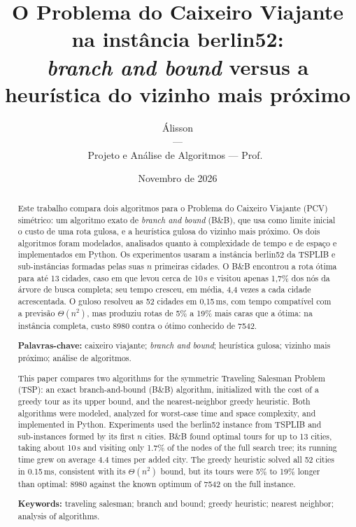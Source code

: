 \documentclass[12pt,a4paper]{article}
\title{O Problema do Caixeiro Viajante na instância berlin52:\\
\emph{branch and bound} versus a heurística do vizinho mais próximo}
\author{%
  Álisson \pendente{sobrenome} \quad \pendente{Integrante 2} \quad \pendente{Integrante 3}\\[6pt]
  \normalsize \pendente{Curso} --- \pendente{Instituição}\\
  \normalsize Projeto e Análise de Algoritmos --- Prof.\ \pendente{nome do professor}%
}
\date{Novembro de 2026}
\begin{document}
\maketitle

\begin{abstract}
Este trabalho compara dois algoritmos para o Problema do Caixeiro Viajante (PCV) simétrico: um algoritmo exato de \emph{branch and bound} (B\&B), que usa como limite inicial o custo de uma rota gulosa, e a heurística gulosa do vizinho mais próximo. Os dois algoritmos foram modelados, analisados quanto à complexidade de tempo e de espaço e implementados em Python. Os experimentos usaram a instância berlin52 da TSPLIB e sub-instâncias formadas pelas suas $n$ primeiras cidades. O B\&B encontrou a rota ótima para até 13 cidades, caso em que levou cerca de 10\,s e visitou apenas 1,7\% dos nós da árvore de busca completa; seu tempo cresceu, em média, 4,4 vezes a cada cidade acrescentada. O guloso resolveu as 52 cidades em 0,15\,ms, com tempo compatível com a previsão $\Theta(n^2)$, mas produziu rotas de 5\% a 19\% mais caras que a ótima: na instância completa, custo 8980 contra o ótimo conhecido de 7542.

\medskip
\noindent\textbf{Palavras-chave:} caixeiro viajante; \emph{branch and bound}; heurística gulosa; vizinho mais próximo; análise de algoritmos.
\end{abstract}

\begin{otherlanguage}{english}
\begin{abstract}
This paper compares two algorithms for the symmetric Traveling Salesman Problem (TSP): an exact branch-and-bound (B\&B) algorithm, initialized with the cost of a greedy tour as its upper bound, and the nearest-neighbor greedy heuristic. Both algorithms were modeled, analyzed for worst-case time and space complexity, and implemented in Python. Experiments used the berlin52 instance from TSPLIB and sub-instances formed by its first $n$ cities. B\&B found optimal tours for up to 13 cities, taking about 10\,s and visiting only 1.7\% of the nodes of the full search tree; its running time grew on average 4.4 times per added city. The greedy heuristic solved all 52 cities in 0.15\,ms, consistent with its $\Theta(n^2)$ bound, but its tours were 5\% to 19\% longer than optimal: 8980 against the known optimum of 7542 on the full instance.

\medskip
\noindent\textbf{Keywords:} traveling salesman; branch and bound; greedy heuristic; nearest neighbor; analysis of algorithms.
\end{abstract}
\end{otherlanguage}
\end{document}
